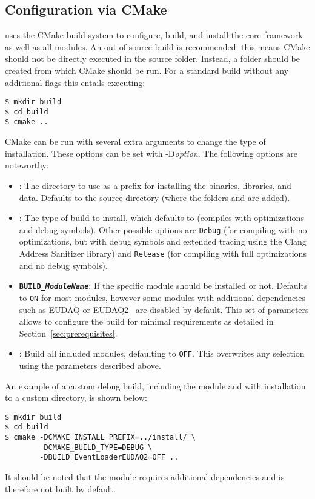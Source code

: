 \subsection{Configuration via CMake}
\label{sec:cmake_config}
\corry uses the CMake build system to configure, build, and install the core framework as well as all modules.
An out-of-source build is recommended: this means CMake should not be directly executed in the source folder.
Instead, a  folder should be created from which CMake should be run.
For a standard build without any additional flags this entails executing:

\begin{verbatim}
$ mkdir build
$ cd build
$ cmake ..
\end{verbatim}

CMake can be run with several extra arguments to change the type of installation.
These options can be set with -D\textit{option}.
The following options are noteworthy:
\begin{itemize}
\item {}: The directory to use as a prefix for installing the binaries, libraries, and data.
Defaults to the source directory (where the folders  and  are added).
\item {}: The type of build to install, which defaults to  (compiles with optimizations and debug symbols).
Other possible options are \texttt{Debug} (for compiling with no optimizations, but with debug symbols and extended tracing using the Clang Address Sanitizer library) and \texttt{Release} (for compiling with full optimizations and no debug symbols).
\item \textbf{\texttt{BUILD\_\textit{ModuleName}}}: If the specific module  should be installed or not.
Defaults to \texttt{ON} for most modules, however some modules with additional dependencies such as EUDAQ or EUDAQ2~\cite{eudaq,eudaq2} are disabled by default.
This set of parameters allows to configure the build for minimal requirements as detailed in Section~\ref{sec:prerequisites}.
\item {}: Build all included modules, defaulting to \texttt{OFF}.
This overwrites any selection using the parameters described above.
\end{itemize}

An example of a custom debug build, including the  module and with installation to a custom directory, is shown below:
\begin{verbatim}
$ mkdir build
$ cd build
$ cmake -DCMAKE_INSTALL_PREFIX=../install/ \
        -DCMAKE_BUILD_TYPE=DEBUG \
        -DBUILD_EventLoaderEUDAQ2=OFF ..
\end{verbatim}
It should be noted that the  module requires additional dependencies and is therefore not built by default.

